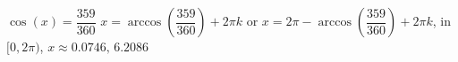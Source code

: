  {$\cos(x) = \dfrac{359}{360}$}
{ $x = \arccos\left(\dfrac{359}{360}\right) + 2\pi k$ or $x = 2\pi - \arccos\left(\dfrac{359}{360}\right) + 2\pi k$, in  $[0, 2\pi)$, $x \approx 0.0746, \, 6.2086$}
